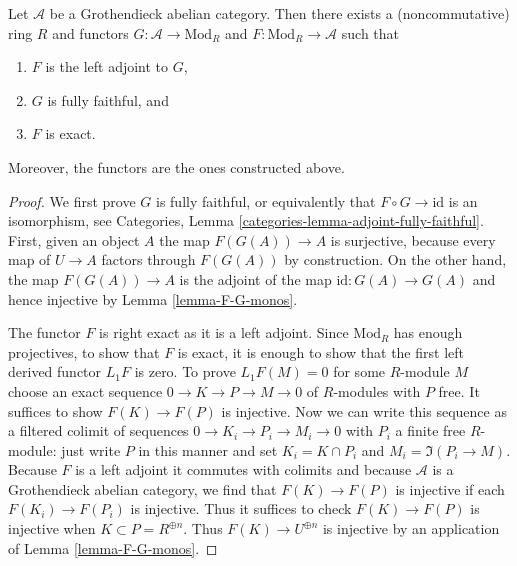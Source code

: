 \begin{theorem}
\label{theorem-gabriel-popescu}
Let $\mathcal{A}$ be a Grothendieck abelian category. Then there exists
a (noncommutative) ring $R$ and functors $G : \mathcal{A} \to \text{Mod}_R$
and $F : \text{Mod}_R \to \mathcal{A}$ such that
\begin{enumerate}
\item $F$ is the left adjoint to $G$,
\item $G$ is fully faithful, and
\item $F$ is exact.
\end{enumerate}
Moreover, the functors are the ones constructed above.
\end{theorem}

\begin{proof}
We first prove $G$ is fully faithful, or equivalently that
$F \circ G \to \text{id}$ is an isomorphism, see
Categories, Lemma \ref{categories-lemma-adjoint-fully-faithful}.
First, given an object $A$ the map $F(G(A)) \to A$ is surjective,
because every map of $U \to A$ factors through $F(G(A))$ by construction.
On the other hand, the map $F(G(A)) \to A$ is the adjoint of the
map $\text{id} : G(A) \to G(A)$ and hence injective by
Lemma \ref{lemma-F-G-monos}.

\medskip\noindent
The functor $F$ is right exact as it is a left adjoint.
Since $\text{Mod}_R$ has enough projectives, to show that
$F$ is exact, it is enough to show that the first left derived
functor $L_1F$ is zero. To prove $L_1F(M) = 0$ for some $R$-module $M$
choose an exact sequence $0 \to K \to P \to M \to 0$
of $R$-modules with $P$ free. It suffices to show $F(K) \to F(P)$
is injective. Now we can write this sequence as a filtered
colimit of sequences $0 \to K_i \to P_i \to M_i \to 0$
with $P_i$ a finite free $R$-module: just write $P$ in this
manner and set $K_i = K \cap P_i$ and $M_i = \Im(P_i \to M)$.
Because $F$ is a left adjoint it commutes
with colimits and because $\mathcal{A}$ is a Grothendieck
abelian category, we find that $F(K) \to F(P)$
is injective if each $F(K_i) \to F(P_i)$ is injective.
Thus it suffices to check $F(K) \to F(P)$
is injective when $K \subset P = R^{\oplus n}$.
Thus $F(K) \to U^{\oplus n}$ is injective by an application
of Lemma \ref{lemma-F-G-monos}.
\end{proof}
